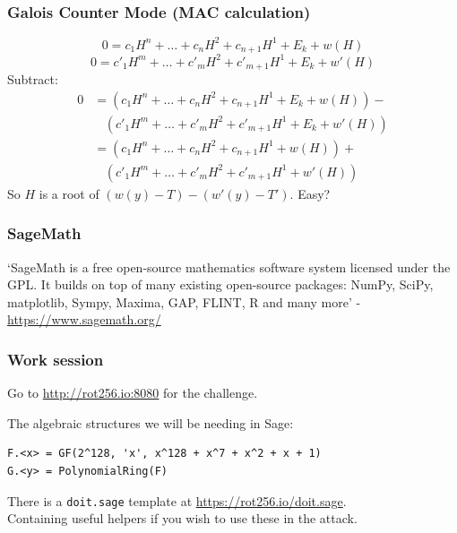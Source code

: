 \documentclass{beamer}
\begin{document}
\begin{frame}
\frametitle{Galois Counter Mode (MAC calculation)}
\[
    0 = c_{1} H^{n} + \ldots + c_{n} H^{2} + c_{n+1} H^{1} + E_{k} + w(H)
\]
\[
    0 = c'_{1} H^{m} + \ldots + c'_{m} H^{2} + c'_{m+1} H^{1} + E_{k} + w'(H)
\]
Subtract:
\begin{align}
    0 &=
    (c_{1} H^{n} + \ldots + c_{n} H^{2} + c_{n+1} H^{1} + E_{k} + w(H)) - \\
    & \ \ \ \ (c'_{1} H^{m} + \ldots + c'_{m} H^{2} + c'_{m+1} H^{1} + E_{k} + w'(H)) \\
    &=(c_{1} H^{n} + \ldots + c_{n} H^{2} + c_{n+1} H^{1} + w(H)) + \\
    & \ \ \ \ (c'_{1} H^{m} + \ldots + c'_{m} H^{2} + c'_{m+1} H^{1} + w'(H))
\end{align}
So $H$ is a root of $(w(y) - T) - (w'(y) - T')$. Easy?
\end{frame}

\begin{frame}
\frametitle{SageMath}
`SageMath is a free open-source mathematics software system licensed under the GPL.
 It builds on top of many existing open-source packages:
 NumPy, SciPy, matplotlib, Sympy, Maxima, GAP, FLINT, R and many more'
 - \url{https://www.sagemath.org/}
\end{frame}

\begin{frame}[fragile]
\frametitle{Work session}

Go to \url{http://rot256.io:8080} for the challenge.

\vspace{3mm}

The algebraic structures we will be needing in Sage:

\begin{verbatim}
F.<x> = GF(2^128, 'x', x^128 + x^7 + x^2 + x + 1)
G.<y> = PolynomialRing(F)
\end{verbatim}

There is a \verb!doit.sage! template at \url{https://rot256.io/doit.sage}. \\
Containing useful helpers if you wish to use these in the attack.

\end{frame}
\end{document}
